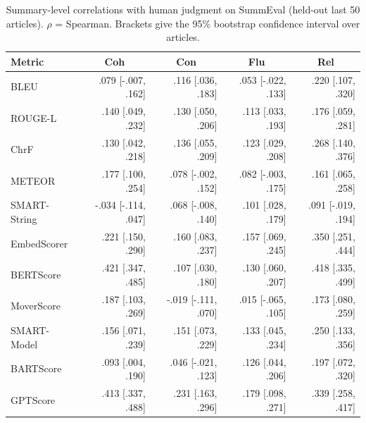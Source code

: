 \begin{table}[t]
\centering
\caption{Summary-level correlations with human judgment on SummEval (held-out last 50 articles). $\rho$ = Spearman. Brackets give the 95\% bootstrap confidence interval over articles.}
\label{tab:correlations_summary}
\small
\linespread{1}\selectfont
\setlength{\tabcolsep}{4pt}
\begin{tabular}{@{}lrrrr@{}}
\toprule
Metric & \multicolumn{1}{c}{Coh} & \multicolumn{1}{c}{Con} & \multicolumn{1}{c}{Flu} & \multicolumn{1}{c}{Rel} \\
\midrule
BLEU & .079 {\scriptsize [-.007, .162]} & .116 {\scriptsize [.036, .183]} & .053 {\scriptsize [-.022, .133]} & .220 {\scriptsize [.107, .320]} \\
ROUGE-L & .140 {\scriptsize [.049, .232]} & .130 {\scriptsize [.050, .206]} & .113 {\scriptsize [.033, .193]} & .176 {\scriptsize [.059, .281]} \\
ChrF & .130 {\scriptsize [.042, .218]} & .136 {\scriptsize [.055, .209]} & .123 {\scriptsize [.029, .208]} & .268 {\scriptsize [.140, .376]} \\
METEOR & .177 {\scriptsize [.100, .254]} & .078 {\scriptsize [-.002, .152]} & .082 {\scriptsize [-.003, .175]} & .161 {\scriptsize [.065, .258]} \\
SMART-String & -.034 {\scriptsize [-.114, .047]} & .068 {\scriptsize [-.008, .140]} & .101 {\scriptsize [.028, .179]} & .091 {\scriptsize [-.019, .194]} \\
EmbedScorer & .221 {\scriptsize [.150, .290]} & .160 {\scriptsize [.083, .237]} & .157 {\scriptsize [.069, .245]} & .350 {\scriptsize [.251, .444]} \\
BERTScore & .421 {\scriptsize [.347, .485]} & .107 {\scriptsize [.030, .180]} & .130 {\scriptsize [.060, .207]} & .418 {\scriptsize [.335, .499]} \\
MoverScore & .187 {\scriptsize [.103, .269]} & -.019 {\scriptsize [-.111, .070]} & .015 {\scriptsize [-.065, .105]} & .173 {\scriptsize [.080, .259]} \\
SMART-Model & .156 {\scriptsize [.071, .239]} & .151 {\scriptsize [.073, .229]} & .133 {\scriptsize [.045, .234]} & .250 {\scriptsize [.133, .356]} \\
BARTScore & .093 {\scriptsize [.004, .190]} & .046 {\scriptsize [-.021, .123]} & .126 {\scriptsize [.044, .206]} & .197 {\scriptsize [.072, .320]} \\
GPTScore & .413 {\scriptsize [.337, .488]} & .231 {\scriptsize [.163, .296]} & .179 {\scriptsize [.098, .271]} & .339 {\scriptsize [.258, .417]} \\

\end{tabular}
\end{table}
